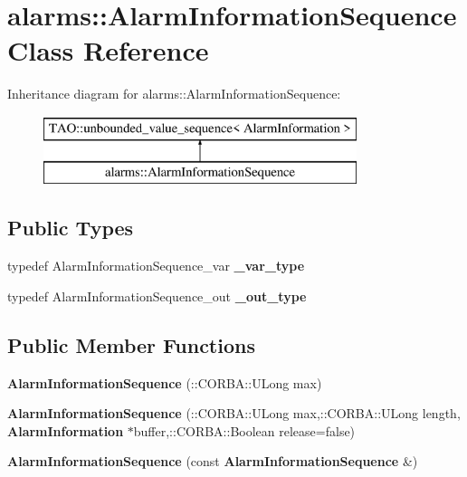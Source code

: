 \section{alarms\+:\+:Alarm\+Information\+Sequence Class Reference}
\label{classalarms_1_1AlarmInformationSequence}
Inheritance diagram for alarms\+:\+:Alarm\+Information\+Sequence\+:\begin{figure}[H]
\begin{center}
\leavevmode
\includegraphics[height=2.000000cm]{classalarms_1_1AlarmInformationSequence}
\end{center}
\end{figure}
\subsection*{Public Types}
\begin{DoxyCompactItemize}
\item 
typedef Alarm\+Information\+Sequence\+\_\+var {\bfseries \+\_\+var\+\_\+type}\label{classalarms_1_1AlarmInformationSequence_a91a5fd41026268202d7a3a078820f583}

\item 
typedef Alarm\+Information\+Sequence\+\_\+out {\bfseries \+\_\+out\+\_\+type}\label{classalarms_1_1AlarmInformationSequence_afcd2ea3eeefb499651220f149782795e}

\end{DoxyCompactItemize}
\subsection*{Public Member Functions}
\begin{DoxyCompactItemize}
\item 
{\bfseries Alarm\+Information\+Sequence} (\+::C\+O\+R\+B\+A\+::\+U\+Long max)\label{classalarms_1_1AlarmInformationSequence_acbaf14e52b2b8fd32e74898f3ba1e380}

\item 
{\bfseries Alarm\+Information\+Sequence} (\+::C\+O\+R\+B\+A\+::\+U\+Long max,\+::C\+O\+R\+B\+A\+::\+U\+Long length, {\bf Alarm\+Information} $\ast$buffer,\+::C\+O\+R\+B\+A\+::\+Boolean release=false)\label{classalarms_1_1AlarmInformationSequence_ad9d02965c1821d6fa62bb6c39bee7403}

\item 
{\bfseries Alarm\+Information\+Sequence} (const {\bf Alarm\+Information\+Sequence} \&)\label{classalarms_1_1AlarmInformationSequence_a409b5b61783a0445c03ae6a55cfb6045}

\end{DoxyCompactItemize}
